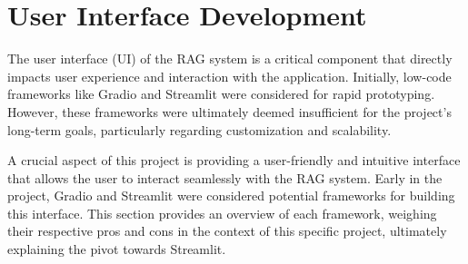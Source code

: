 \documentclass[12pt]{report}
\begin{document}
\section{User Interface Development}
The user interface (UI) of the RAG system is a critical component that directly impacts user experience and interaction with the application. Initially, low-code frameworks like Gradio and Streamlit were considered for rapid prototyping. However, these frameworks were ultimately deemed insufficient for the project's long-term goals, particularly regarding customization and scalability.

A crucial aspect of this project is providing a user-friendly and intuitive interface that allows the user to interact seamlessly with the RAG system. Early in the project, Gradio and Streamlit were considered potential frameworks for building this interface. This section provides an overview of each framework, weighing their respective pros and cons in the context of this specific project, ultimately explaining the pivot towards Streamlit.
\end{document}
